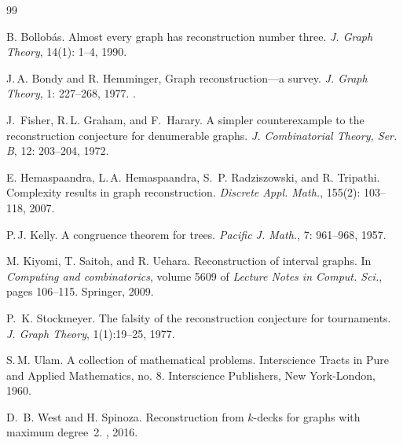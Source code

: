 \documentclass[12pt]{article}
\begin{document}
\begin{thebibliography}{99}

 B. Bollob{\'a}s.  Almost every
  graph has reconstruction number three.  \emph{J. Graph Theory},
  14(1): 1--4, 1990.

 J.\,A. Bondy and R. Hemminger,
 Graph reconstruction---a survey.
\emph{J. Graph Theory}, 1: 227--268, 1977. .

 J.~Fisher, R.\,L. Graham, and F.~Harary.  
  A simpler counterexample to the reconstruction conjecture for
  denumerable graphs.  \emph{J. Combinatorial Theory, Ser. B},
  12: 203--204, 1972.

 E. Hemaspaandra, L.\,A. Hemaspaandra,
  S.~P. Radziszowski, and R. Tripathi. 
  Complexity results in graph reconstruction.  \emph{Discrete
    Appl. Math.}, 155(2): 103--118, 2007.

 P.\,J. Kelly.  A congruence theorem for
  trees.  \emph{Pacific J. Math.}, 7: 961--968, 1957.

 M. Kiyomi, T. Saitoh, and R. Uehara.
   Reconstruction of interval graphs.  In 
    \emph{Computing and combinatorics}, volume 5609 of
    \emph{Lecture Notes in Comput. Sci.}, pages 106--115. Springer, 2009.

 P.~K. Stockmeyer.  The falsity of the
  reconstruction conjecture for tournaments.  \emph{J. Graph
    Theory}, 1(1):19--25, 1977.

 S.\,M. Ulam.  A collection of
    mathematical problems.  Interscience Tracts in Pure and
  Applied Mathematics, no. 8.  Interscience Publishers, New
  York-London, 1960.
  
 D.~B. West and H. Spinoza.
  Reconstruction from $k$-decks for graphs with maximum degree~2.
  , 2016.

\end{thebibliography}
\end{document}
